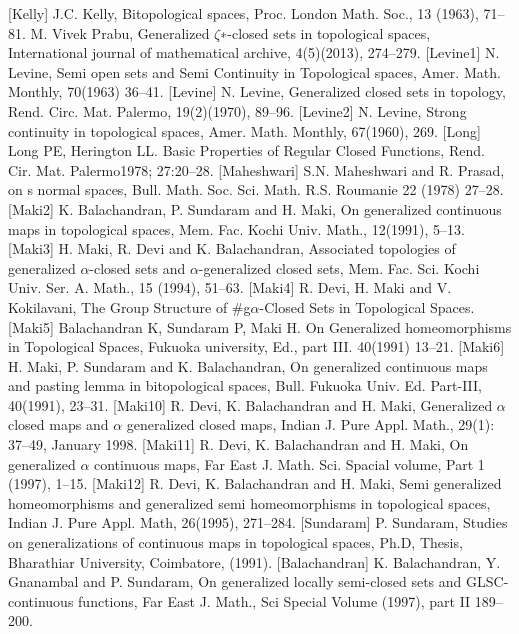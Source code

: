 \begin{thebibliography}{99}
 [Kelly] J.C. Kelly, Bitopological spaces, Proc. London Math. Soc., 13 (1963), 71--81.
 M. Vivek Prabu, Generalized $\zeta$∗-closed sets in topological spaces, International journal of mathematical archive, 4(5)(2013), 274--279.
 [Levine1] N. Levine, Semi open sets and Semi Continuity in Topological spaces, Amer. Math. Monthly, 70(1963) 36--41.
 [Levine] N. Levine, Generalized closed sets in topology, Rend. Circ. Mat. Palermo,  19(2)(1970), 89--96.
 [Levine2] N. Levine, Strong continuity in topological spaces, Amer. Math. Monthly, 67(1960), 269.
 [Long] Long PE, Herington LL. Basic Properties of Regular Closed Functions, Rend. Cir. Mat. Palermo1978; 27:20--28. 
 [Maheshwari] S.N. Maheshwari and R. Prasad, on s normal spaces, Bull. Math. Soc. Sci. Math. R.S. Roumanie 22 (1978) 27--28.
 [Maki2] K. Balachandran, P. Sundaram and H. Maki, On generalized continuous maps in topological spaces, Mem. Fac. Kochi Univ. Math., 12(1991), 5--13. 
 [Maki3] H. Maki, R. Devi and K. Balachandran, Associated topologies of generalized $\alpha$-closed sets and $\alpha$-generalized closed sets, Mem. Fac. Sci. Kochi Univ. Ser. A. Math., 15 (1994), 51--63.
 [Maki4] R. Devi, H. Maki and V. Kokilavani, The Group Structure of #g$\alpha$-Closed Sets in Topological Spaces.
 [Maki5] Balachandran K, Sundaram P, Maki H. On Generalized homeomorphisms in Topological Spaces, Fukuoka university, Ed., part III. 40(1991) 13--21.
 [Maki6] H. Maki, P. Sundaram and K. Balachandran, On generalized continuous maps and pasting lemma in bitopological spaces, Bull. Fukuoka Univ. Ed. Part-III, 40(1991), 23--31.
 [Maki10] R. Devi, K. Balachandran and H. Maki, Generalized $\alpha$ closed maps and $\alpha$ generalized closed maps, Indian J. Pure Appl. Math., 29(1): 37--49, January 1998.
 [Maki11] R. Devi, K. Balachandran and H. Maki, On generalized $\alpha$ continuous maps, Far East J. Math. Sci. Spacial volume, Part 1 (1997), 1--15.
 [Maki12] R. Devi, K. Balachandran and H. Maki, Semi generalized homeomorphisms and generalized semi homeomorphisms in topological spaces, Indian J. Pure Appl. Math, 26(1995), 271--284.
 [Sundaram] P. Sundaram, Studies on generalizations of continuous maps in topological spaces, Ph.D, Thesis, Bharathiar University, Coimbatore, (1991).
 [Balachandran] K. Balachandran, Y. Gnanambal and P. Sundaram, On generalized locally semi-closed sets and GLSC-continuous functions, Far East J. Math., Sci Special Volume (1997), part II 189--200.

\end{thebibliography}
